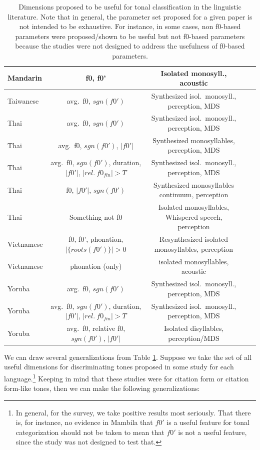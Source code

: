 \documentclass[12pt]{article}
\begin{document}
\begin{table}
{\begin{tabular}{l | c | c | c | c }
Mandarin & f0, f0'  & Isolated monosyll., acoustic  &
\citet{Howie:1976} \\\hline
Taiwanese & avg.\ f0, $sgn(f0')$  & Synthesized isol.\
monosyll., perception, MDS & \cite{Gandour:1983} \\\hline
Thai & avg.\ f0, $sgn(f0')$  & Synthesized isol.\
monosyll., perception, MDS & \cite{Gandour:1983} \\
Thai & avg.\ f0, $sgn(f0')$, $|f0'| $  & Synthesized monosyllables,
perception, MDS & \cite{Gandour:1979} \\
Thai & avg.\ f0, $sgn(f0')$, duration, $|f0'|$, $|rel.\ f0_{fin}| > T$ & Synthesized isol.\ monosyll., perception, MDS & \cite{Gandour:1978a} \\
Thai & f0, $|f0'|$, $sgn(f0')$  & Synthesized monosyllables continuum, perception &
\cite{Abramson:1978} \\
Thai & Something not f0 & Isolated monosyllables, Whispered speech, perception  & \cite{Abramson:1972} \\\hline
Vietnamese & f0, f0', phonation, $|\{roots(f0')\}| > 0$ & Resynthesized isolated
monosyllables, perception & \citet{Brunelle:2009} \\
Vietnamese & phonation (only) & isolated
monosyllables, acoustic & \citet{Pham:2003} \\\hline
Yoruba & avg.\ f0, $sgn(f0')$  & Synthesized isol.\
monosyll., perception, MDS & \cite{Gandour:1983} \\
Yoruba & avg.\ f0, $sgn(f0')$, duration, $|f0'|$, $|rel.\ f0_{fin}| > T$ & Synthesized isol.\ monosyll., perception, MDS & \cite{Gandour:1978a} \\
Yoruba & avg.\ f0, relative f0, $sgn(f0')$, $|f0'|$ & Isolated disyllables, perception/MDS & \citet{Hombert:1976} \\
  \end{tabular}}
  \caption{Dimensions proposed to be useful for tonal classification in
    the linguistic literature. Note that in general, the parameter set
    proposed for a given paper is not intended to be exhaustive. For
    instance, in some cases, non f0-based parameters were proposed/shown
  to be useful but not f0-based parameters because the studies were not
  designed to address the usefulness of f0-based parameters.}
  \label{tab:features}
\end{table}

\clearpage

We can draw several generalizations from Table
\ref{tab:features}. Suppose we take the set of all useful dimensions
for discriminating tones
proposed in some study for each language.\footnote{In general, for the survey,
we take positive results most seriously. That there is, for instance,
no evidence in Mambila that $f0'$ is a useful feature for tonal
categorization should not be taken to mean that $f0'$ is not a useful
feature, since the study was not designed to test that.} Keeping in
mind that these studies were for citation form or citation form-like
tones, then we can make the following generalizations:
\end{document}
